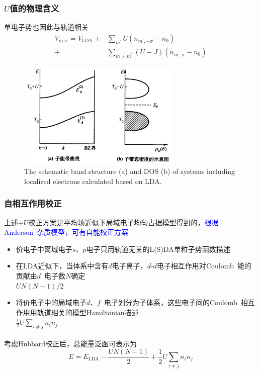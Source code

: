 \documentclass[cjk,slidestop,compress,mathserif,blue]{beamer}
\newcommand{\upcite}[1]{\hspace{0ex}\textsuperscript{\cite{#1}}} %
\begin{document}
\frame
{
	\frametitle{$U$值的物理含义}
	单电子势也因此与轨道相关
	\begin{displaymath}
		\begin{aligned}
			V_{m,\sigma}=V_{\mathrm{LDA}}+&\sum_{m^{\prime}}U(n_{m^{\prime},-\sigma}-n_0)\\
			+&\sum_{m\neq m^{\prime}}(U-J)(n_{m^{\prime},\sigma}-n_0)
		\end{aligned}
	\end{displaymath}
\begin{figure}[h!]
\centering
\vspace*{-0.3in}
\includegraphics[height=2.0in,width=3.1in,viewport=0 0 1250 880,clip]{Figures/LDA_U-4.png}
\caption{\tiny \textrm{The schematic band structure (a) and DOS (b) of systems including localized electrons calculated based on LDA.}}%
\label{LDA_U-4}
\end{figure}
}

\frame
{
	\frametitle{自相互作用校正}
	上述$+U$校正方案是平均场近似下局域电子均匀占据模型得到的，\textcolor{blue}{根据\textrm{Anderson~}杂质模型，可有自能校正方案}
	\begin{itemize}
		\item 价电子中离域电子$s$、$p$电子只用轨道无关的\textrm{L(S)DA}单粒子势函数描述
		\item 在\textrm{LDA}近似下，当体系中含有$d$电子离子，$d$-$d$电子相互作用对\textrm{Coulomb~}能的贡献由$d$~电子数$N$确定\\$UN(N-1)/2$
		\item 将价电子中的局域电子$d$、$f$~电子划分为子体系，这些电子间的\textrm{Coulomb}~相互作用用轨道相关的模型\textrm{Hamiltonian}描述\\$\frac12U\sum\limits_{i\neq j}n_in_j$
	\end{itemize}
	考虑\textrm{Hubbard}校正后，总能量泛函可表示为\upcite{PRB48-16929_1993}
	$$E=E_{\mathrm{LDA}}-\frac{UN(N-1)}2+\frac12U\sum\limits_{i\neq j}n_in_j$$
}
\end{document}
